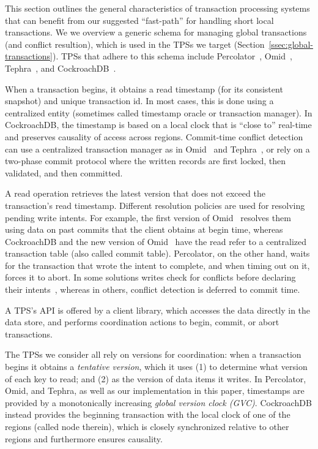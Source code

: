
This section outlines the general characteristics of transaction processing systems that can benefit from our 
suggested ``fast-path'' for handling short local transactions. 
We we overview a generic schema for managing global transactions 
(and conflict resultion), which is used in the TPSs we target (Section~\ref{ssec:global-transactions}).
TPSs that adhere to this schema include Percolator~\cite{Percolator2010}, Omid~\cite{OmidICDE2014}, Tephra~\cite{tephra}, and CockroachDB~\cite{cockroach}.

When a transaction begins, it obtains a read timestamp (for its consistent snapshot) and unique transaction id.
In most cases, this is done using a centralized entity (sometimes called timestamp oracle or transaction manager). 
In CockroachDB, the timestamp is based on a local clock that is ``close to'' real-time and preserves causality of access 
across regions. Commit-time conflict detection can use a centralized transaction manager as in Omid~\cite{OmidICDE2014,omid-blog} and Tephra~\cite{tephra}, or rely on a two-phase commit protocol where the written records are first 
locked, then validated, and then committed. 

A read operation retrieves the latest version that does not exceed the transaction's read timestamp. 
Different resolution policies are used for resolving pending write intents. For example, the first version of Omid~\cite{OmidICDE2014}
resolves them using data on past commits that the client obtains at begin time, 
whereas CockroachDB and the new version of Omid~\cite{omid-blog} have the read refer to a centralized transaction table (also called commit table).  Percolator, on the other hand, waits for the transaction that wrote the intent to complete, and when timing out on it, forces it to abort. 
In some solutions writes check for conflicts before declaring their intents~\cite{cockroach}, whereas in others, 
conflict detection is deferred to commit time. 


A TPS's API is offered by a client library, which accesses the data directly in the data store, and 
performs coordination actions to begin, commit, or abort transactions. 

The TPSs we consider all rely on versions for coordination: when a transaction begins it obtains a \emph{tentative version}, which 
it uses (1) to determine what version of each key to read; and (2) as the version of data items it writes.   
In Percolator, Omid, and Tephra, as well as our implementation in this paper, timestamps are provided by a monotonically
increasing \emph{global version  clock (GVC)}. CockroachDB instead provides the beginning transaction with the local clock of
one of the regions (called node therein), which is closely synchronized relative to other regions and furthermore ensures causality.


